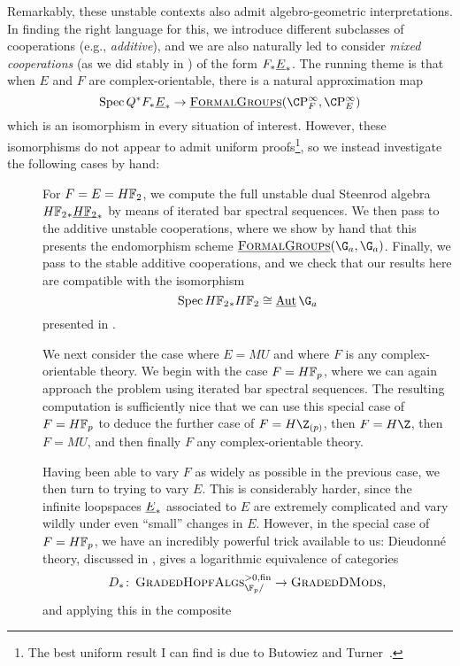 Remarkably, these unstable contexts also admit algebro-geometric interpretations.  In finding the right language for this, we introduce different subclasses of cooperations (e.g., \textit{additive}), and we are also naturally led to consider \textit{mixed cooperations} (as we did stably in ) of the form \(F_* \underline{\smash{E}}_{*}\).  The running theme is that when \(E\) and \(F\) are complex-orientable, there is a natural approximation map \[\Spec Q^* F_* \OS{E}{*} \to \InternalHom{FormalGroups}(\CP^\infty_F, \CP^\infty_E)\] which is an isomorphism in every situation of interest.  However, these isomorphisms do not appear to admit uniform proofs\footnote{The best uniform result I can find is due to Butowiez and Turner~\cite[Theorem 3.12]{ButowiezTurner}.}, so we instead investigate the following cases by hand:
\begin{description}
\item[{}] For \(F = E = \HFtwo\), we compute the full unstable dual Steenrod algebra \(\HFtwo_* \OS{\HFtwo}{*}\) by means of iterated bar spectral sequences.  We then pass to the additive unstable cooperations, where we show by hand that this presents the endomorphism scheme \(\InternalHom{FormalGroups}(\G_a, \G_a)\).  Finally, we pass to the stable additive cooperations, and we check that our results here are compatible with the isomorphism \[\Spec \HFtwo_* \HFtwo \cong \InternalAut{\G_a}\] presented in .
\item[{}] We next consider the case where \(E = MU\) and where \(F\) is any complex-orientable theory.  We begin with the case \(F = \HFp\), where we can again approach the problem using iterated bar spectral sequences.  The resulting computation is sufficiently nice that we can use this special case of \(F = \HFp\) to deduce the further case of \(F = H\Z_{(p)}\), then \(F = H\Z\), then \(F = MU\), and then finally \(F\) any complex-orientable theory.
\item[{}] Having been able to vary \(F\) as widely as possible in the previous case, we then turn to trying to vary \(E\).  This is considerably harder, since the infinite loopspaces \(\underline{\smash{E}}_{*}\) associated to \(E\) are extremely complicated and vary wildly under even ``small'' changes in \(E\).  However, in the special case of \(F = \HFp\), we have an incredibly powerful trick available to us: Dieudonn\'e theory, discussed in , gives a logarithmic equivalence of categories \[D_*\co \CatOf{GradedHopfAlgs}^{> 0, \fin}_{\F_p/} \to \CatOf{GradedDMods},\] and applying this in the composite

\end{description}
